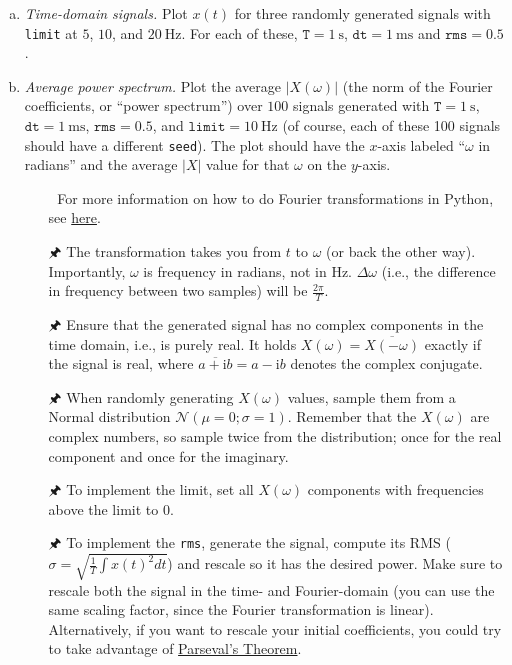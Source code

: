 	\begin{enumerate}[a)]
		\item {} \textit{Time-domain signals.} Plot $x(t)$ for three randomly generated signals with \texttt{limit} at $5$, $10$, and $\SI{20}{\hertz}$. For each of these, $\mathtt{T}=\SI{1}{\second}$, $\mathtt{dt}=\SI{1}{\milli\second}$ and $\mathtt{rms}=0.5$.
		\item {} \textit{Average power spectrum.} Plot the average $|X(\omega)|$ (the norm of the Fourier coefficients, or \enquote{power spectrum}) over $100$ signals generated with $\mathtt{T}=\SI{1}{\second}$, $\mathtt{dt}=\SI{1}{\milli\second}$, $\mathtt{rms}=0.5$, and $\mathtt{limit}=\SI{10}{\hertz}$ (of course, each of these 100 signals should have a different \texttt{seed}). The plot should have the $x$-axis labeled \enquote{$\omega$ in radians} and the average $|X|$ value for that $\omega$ on the $y$-axis.
		\begin{itemize}
			\item[{\symbolfont 🐍}] For more information on how to do Fourier transformations in Python, see \href{http://docs.scipy.org/doc/numpy/reference/routines.fft.html}{here}.
			\item[{\symbolfont 🖈}] The transformation takes you from $t$ to $\omega$ (or back the other way). Importantly, $\omega$ is frequency in radians, not in Hz. $\Delta \omega$ (i.e., the difference in frequency between two samples) will be $\frac{2\pi}T$.
			\item[{\symbolfont 🖈}] Ensure that the generated signal has no complex components in the time domain, i.e., is purely real. It holds $X(\omega)=\overline{X(-\omega)}$ exactly if the signal is real, where $\overline{a + \mathrm{i}b} = a - \mathrm{i}b$ denotes the complex conjugate.
			\item[{\symbolfont 🖈}] When randomly generating $X(\omega)$ values, sample them from a Normal distribution $\mathcal{N}(\mu=0; \sigma=1)$. Remember that the $X(\omega)$ are complex numbers, so sample twice from the distribution; once for the real component and once for the imaginary.
			\item[{\symbolfont 🖈}] To implement the limit, set all $X(\omega)$ components with frequencies above the limit to $0$.
			\item[{\symbolfont 🖈}] To implement the \texttt{rms}, generate the signal, compute its RMS ($\sigma = \sqrt{\frac{1}T \int{x(t)^2}dt}$) and rescale so it has the desired power. Make sure to rescale both the signal in the time- and Fourier-domain (you can use the same scaling factor, since the Fourier transformation is linear). Alternatively, if you want to rescale your initial coefficients, you could try to take advantage of \href{https://en.wikipedia.org/wiki/Parseval%27s_theorem#Notation_used_in_physics}{Parseval's Theorem}.
		\end{itemize}
	\end{enumerate}

